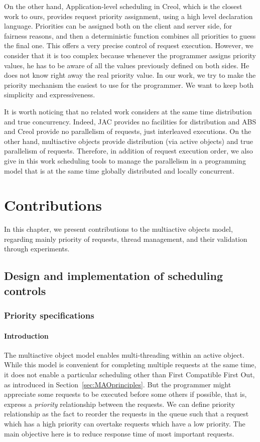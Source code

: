 \documentclass[11pt]{report}
\begin{document}
On the other hand, Application-level scheduling in Creol, which is the closest work to ours, provides request priority assignment, using a high level declaration language. Priorities can be assigned both on the client and server side, for fairness reasons, and then a deterministic function combines all priorities to guess the final one. This offers a very precise control of request execution. However, we consider that it is too complex because whenever the programmer assigns priority values, he has to be aware of all the values previously defined on both sides. He does not know right away the real priority value. In our work, we try to make the priority mechanism the easiest to use for the programmer. We want to keep both simplicity and expressiveness.

It is worth noticing that no related work considers at the same time distribution and true concurrency. Indeed, JAC provides no facilities for distribution and ABS and Creol provide no parallelism of requests, just interleaved executions. On the other hand, multiactive objects provide distribution (via active objects) and true parallelism of requests. Therefore, in addition of request execution order, we also give in this work scheduling tools to manage the parallelism in a programming model that is at the same time globally distributed and locally concurrent.

\chapter{Contributions}\label{sec:contributions}
In this chapter, we present contributions to the multiactive objects model, regarding mainly priority of requests, thread management, and their validation through experiments.

\section{Design and implementation of scheduling controls}
\subsection{Priority specifications}
\subsubsection{Introduction}
The multiactive object model enables multi-threading within an active object. While this model is convenient for completing multiple requests at the same time, it does not enable a particular scheduling other than First Compatible First Out, as introduced in Section~\ref{sec:MAOprinciples}. But the programmer might appreciate some requests to be executed before some others if possible, that is, express a \emph{priority} relationship between the requests. 
We can define priority relationship as the fact to reorder the requests in the queue such that a request which has a high priority can overtake requests which have a low priority. 
The main objective here is to reduce response time of most important requests. 
\end{document}
